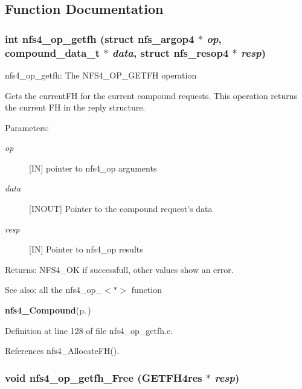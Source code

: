 \subsection{Function Documentation}
\subsubsection{\setlength{\rightskip}{0pt plus 5cm}int nfs4\_\-op\_\-getfh (struct nfs\_\-argop4 $\ast$ {\em op}, compound\_\-data\_\-t $\ast$ {\em data}, struct nfs\_\-resop4 $\ast$ {\em resp})}\label{nfs4__op__getfh_8c_a0}


nfs4\_\-op\_\-getfh: The NFS4\_\-OP\_\-GETFH operation

Gets the current\-FH for the current compound requests. This operation returns the current FH in the reply structure.

\begin{Desc}
\item[Parameters:]
\begin{description}
\item[{\em op}][IN] pointer to nfs4\_\-op arguments \item[{\em data}][INOUT] Pointer to the compound request's data \item[{\em resp}][IN] Pointer to nfs4\_\-op results\end{description}
\end{Desc}
\begin{Desc}
\item[Returns:]NFS4\_\-OK if successfull, other values show an error.\end{Desc}
\begin{Desc}
\item[See also:]all the nfs4\_\-op\_\-$<$$\ast$$>$ function 

{\bf nfs4\_\-Compound}{\rm (p.\,\pageref{nfs4__Compound_8c_a4})} \end{Desc}


Definition at line 128 of file nfs4\_\-op\_\-getfh.c.

References nfs4\_\-Allocate\-FH().
\subsubsection{\setlength{\rightskip}{0pt plus 5cm}void nfs4\_\-op\_\-getfh\_\-Free (GETFH4res $\ast$ {\em resp})}\label{nfs4__op__getfh_8c_a1}


